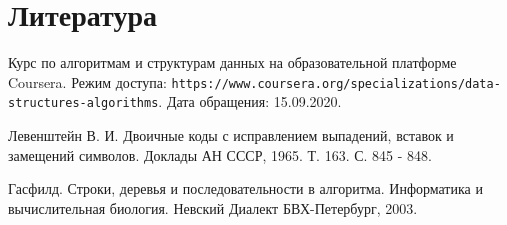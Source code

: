 \chapter*{Литература}

\begin{thebibliography}{9}

Курс по алгоритмам и структурам данных на образовательной платформе Coursera. 
Режим доступа: \texttt{https://www.coursera.org/specializations/data-structures-algorithms}. Дата обращения: 15.09.2020.

Левенштейн В. И. Двоичные коды с исправлением выпадений, вставок и замещений символов. Доклады АН СССР, 1965. Т. 163. С. 845 - 848.

Гасфилд. Строки, деревья и последовательности в алгоритма. Информатика и вычислительная биология. Невский Диалект БВХ-Петербург, 2003.

\end{thebibliography}
